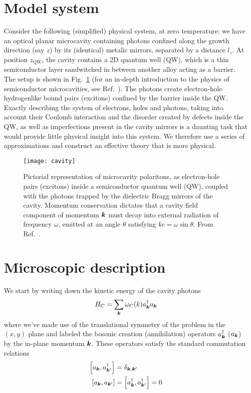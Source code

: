 \section{Model system}
\label{sec:model-sys}



Consider the following (simplified) physical system, at zero
temperature: we have an optical planar microcavity containing photons
confined along the growth direction (say $z$) by its (identical)
metalic mirrors, separated by a distance $l_z$. At position
$z_{\text{QW}}$, the cavity contains a 2D quantum well (QW), which is
a thin semiconductor layer sandwitched in between another alloy acting
as a barrier. The setup is shown in Fig.~\ref{fig:cavity-polaritons}
(for an in-depth introduction to the physics of semiconductor
microcavities, see Ref.~\cite{9780199228942}). The photons create
electron-hole hydrogenlike bound pairs (excitons) confined by the
barrier inside the QW. Exactly describing the system of electrons,
holes and photons, taking into account their Coulomb interaction and
the disorder created by defects inside the QW, as well as
imperfections present in the cavity mirrors is a daunting task that
would provide little physical insight into this system. We therefore
use a series of approximations and construct an effective theory that
is more physical.
%
\begin{figure}[tb]\centering
  \texttt{[image: cavity]}
  \caption{
    Pictorial representation of microcavity polaritons, as electron-hole pairs (excitons) inside a semiconductor quantum well (QW), 
    coupled with the photons trapped by the dielectric Bragg mirrors of the cavity. 
    Momentum conservation dictates that a cavity field component of momentum $\bm{k}$ must decay into external radiation of frequency $\omega$, emitted at an angle $\theta$ satisfying $k c = \omega \sin\theta$.
    From Ref.~\cite{Kasprzak_2006}.
  }\label{fig:cavity-polaritons}
\end{figure}

\section{Microscopic description}
\label{sec:microscopic}


We start by writing down the kinetic energy of the cavity photons
%
\begin{equation}\label{eq:cavity-energy}
  H_{C} = \sum_{\bm{k}} \omega_C(k) a_{\bm{k}}^{\dagger} a_{\bm{k}}
\end{equation}
% 
where we've made use of the translational symmetry of the problem in
the $(x,y)$ plane and labeled the bosonic creation (annihilation)
operators $a_{\bm{k}}^{\dagger}$ ($a_{\bm{k}}$) by the in-plane momentum
$\bm{k}$. These operators satisfy the standard commutation relations
\begin{align}
  \left[a_{\bm{k}}, a_{\bm{k}^{\prime}}^{\dagger}\right] & =\delta_{\bm{k},\bm{k}^{\prime}}\\
  \left[a_{\bm{k}}, a_{\bm{k}^{\prime}}\right] & =\left[a_{\bm{k}}^{\dagger}, a_{\bm{k}^{\prime}}^{\dagger}\right] = 0
\end{align}

